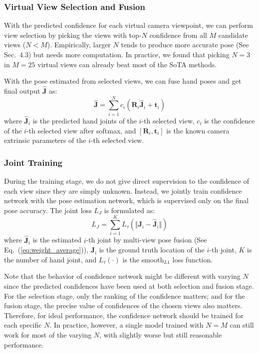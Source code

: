 \documentclass[letterpaper]{article} \usepackage{aaai22}  \usepackage{times}  \usepackage{helvet}  \usepackage{courier}  \usepackage[hyphens]{url}  \usepackage{graphicx} \urlstyle{rm} \def\UrlFont{\rm}  \usepackage{natbib}  \usepackage{caption} \DeclareCaptionStyle{ruled}{labelfont=normalfont,labelsep=colon,strut=off} \frenchspacing  \setlength{\pdfpagewidth}{8.5in}  \setlength{\pdfpageheight}{11in}  \usepackage{algorithm}
\begin{document}
\subsubsection{Virtual View Selection and Fusion}
With the predicted confidence for each virtual camera viewpoint, we can perform view selection by picking the views with top-$N$ 
confidence from all $M$ candidate views ($N<M$).
Empirically, larger $N$ tends to produce more accurate pose (See Sec.~4.3) but needs more computation.
In practice, we found that picking $N=3$ in $M=25$ virtual views can already beat most of the SoTA methods.

With the pose estimated from selected views,
we can fuse hand poses and get final output $\hat{\mathbf{J}}$ as:
\begin{equation}
\label{eq:weight_average}
\hat{\mathbf{J}} = \sum_{i=1}^{N} c_i (\mathbf{R}_i\hat{\mathbf{J}}_i+\mathbf{t}_i)
\end{equation}
where $\hat{\mathbf{J}}_i$ is the predicted hand joints of the $i$-th selected view, $c_i$ is the confidence of the $i$-th selected view after softmax, and $[\mathbf{R}_i,\mathbf{t}_i]$ is the known camera extrinsic parameters of the $i$-th selected view.

\subsubsection{Joint Training}
During the training stage, we do not give direct supervision to the confidence of each view since they are simply unknown.
Instead, we jointly train confidence network with the pose estimation network, which is supervised only on the final pose accuracy.
The joint loss $L_{J}$ is formulated as:
\begin{equation}
\label{eq:conf_loss}
L_{J}=\sum_{i=1}^K L_{\tau}( \Vert \mathbf{J}_i-\hat{\mathbf{J}}_i \Vert)
\end{equation}
where $\hat{\mathbf{J}}_i$ is the estimated $i$-th joint by multi-view pose fusion (See Eq.~(\ref{eq:weight_average})), $\mathbf{J}_i$ is the ground truth location of the $i$-th joint, $K$ is the number of hand joint, and $L_{\tau}(\cdot)$ is the smooth$_{L1}$ loss function. 

Note that the behavior of confidence network might be different with varying $N$ since the predicted confidences have been used at both selection and fusion stage.
For the selection stage, only the ranking of the confidence matters; and for the fusion stage, the precise value of confidences of the chosen views also matters.
Therefore, for ideal performance, the confidence network should be trained for each specific $N$.
In practice, however, a single model trained with $N=M$ can still work for most of the varying $N$, with slightly worse but still reasonable performance.
\end{document}
